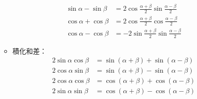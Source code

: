 \begin{enumerate}
\begin{itemize}
\begin{subequations}
\begin{align}
                \sin\alpha - \sin\beta & = 2\cos\frac{\alpha + \beta}{2}\sin\frac{\alpha - \beta}{2} \\
                \cos\alpha + \cos\beta & = 2\cos\frac{\alpha + \beta}{2}\cos\frac{\alpha - \beta}{2} \\
                \cos\alpha - \cos\beta & = -2\sin\frac{\alpha + \beta}{2}\sin\frac{\alpha - \beta}{2}
            \end{align}
        \end{subequations}
        \item 積化和差： \begin{subequations}
            \begin{align}
                2\sin\alpha\cos\beta & = \sin(\alpha + \beta) + \sin(\alpha - \beta) \\
                2\cos\alpha\sin\beta & = \sin(\alpha + \beta) - \sin(\alpha - \beta) \\
                2\cos\alpha\cos\beta & = \cos(\alpha + \beta) + \cos(\alpha - \beta) \\
                2\sin\alpha\sin\beta & = \cos(\alpha + \beta) - \cos(\alpha - \beta)
            \end{align}
        \end{subequations}
    \end{itemize}
\end{enumerate}

\pagebreak